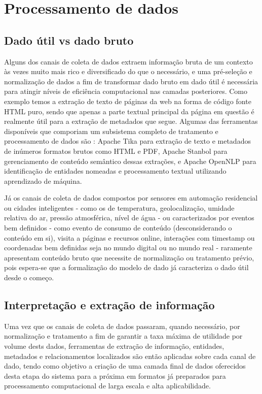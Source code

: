 \chapter{Processamento de dados}

\section{Dado útil vs dado bruto}

Alguns dos canais de coleta de dados extraem informação bruta de um contexto às vezes muito mais rico e diversificado do que o necessário, e uma pré-seleção e normalização de dados a fim de transformar dado bruto em dado útil é necessária para atingir níveis de eficiência computacional nas camadas posteriores. Como exemplo temos a extração de texto de páginas da web na forma de código fonte HTML puro, sendo que apenas a parte textual principal da página em questão é realmente útil para a extração de metadados que segue. Algumas das ferramentas disponíveis que comporiam um subsistema completo de tratamento e processamento de dados são \cite{ital:jung-andrew}: Apache Tika \cite{apache:tika} para extração de texto e metadados de inúmeros formatos brutos como HTML e PDF, Apache Stanbol \cite{apache:stanbol} para gerenciamento de conteúdo semântico dessas extrações, e Apache OpenNLP \cite{apache:opennlp} para identificação de entidades nomeadas e processamento textual utilizando aprendizado de máquina.

Já os canais de coleta de dados compostos por sensores em automação residencial ou cidades inteligentes - como os de temperatura, geolocalização, umidade relativa do ar, pressão atmosférica, nível de água - ou caracterizados por eventos bem definidos - como evento de consumo de conteúdo (desconsiderando o conteúdo em si), visita a páginas e recursos online, interações com timestamp ou coordenadas bem definidas seja no mundo digital ou no mundo real - raramente apresentam conteúdo bruto que necessite de normalização ou tratamento prévio, pois espera-se que a formalização do modelo de dado já caracteriza o dado útil desde o começo.

\section{Interpretação e extração de informação}

Uma vez que os canais de coleta de dados passaram, quando necessário, por normalização e tratamento a fim de garantir a taxa máxima de utilidade por volume dests dados, ferramentas de extração de informação, entidades, metadados e relacionamentos localizados são então aplicadas sobre cada canal de dado, tendo como objetivo a criação de uma camada final de dados oferecidos desta etapa do sistema para a próxima em formatos já preparados para processamento computacional de larga escala e alta aplicabilidade.

